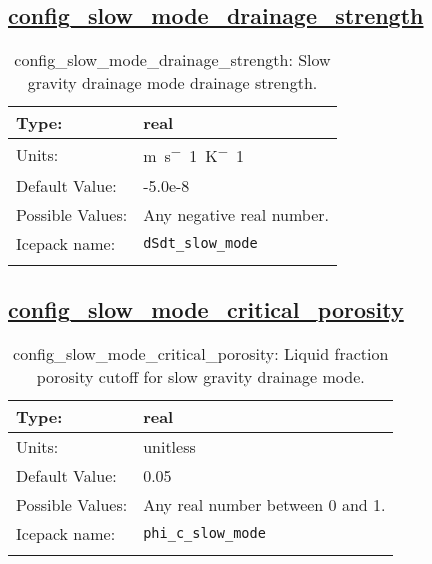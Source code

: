 \subsection[config\_slow\_mode\_drainage\_strength]{\hyperref[sec:nm_tab_thermodynamics]{config\_slow\_mode\_drainage\_strength}}
\label{subsec:nm_sec_config_slow_mode_drainage_strength}
\begin{center}
\begin{longtable}{| p{2.0in} || p{4.0in} |}
    \hline
    Type: & real \\
    \hline
    Units: & \si{m.s^-1.K^-1} \\
    \hline
    Default Value: & -5.0e-8 \\
    \hline
    Possible Values: & Any negative real number. \\
    \hline
    \hline
    Icepack name: & \verb+dSdt_slow_mode+ \\
    \caption{config\_slow\_mode\_drainage\_strength: Slow gravity drainage mode drainage strength.}
\end{longtable}
\end{center}
\subsection[config\_slow\_mode\_critical\_porosity]{\hyperref[sec:nm_tab_thermodynamics]{config\_slow\_mode\_critical\_porosity}}
\label{subsec:nm_sec_config_slow_mode_critical_porosity}
\begin{center}
\begin{longtable}{| p{2.0in} || p{4.0in} |}
    \hline
    Type: & real \\
    \hline
    Units: & \si{unitless} \\
    \hline
    Default Value: & 0.05 \\
    \hline
    Possible Values: & Any real number between 0 and 1. \\
    \hline
    \hline
    Icepack name: & \verb+phi_c_slow_mode+ \\
    \caption{config\_slow\_mode\_critical\_porosity: Liquid fraction porosity cutoff for slow gravity drainage mode.}
\end{longtable}
\end{center}
